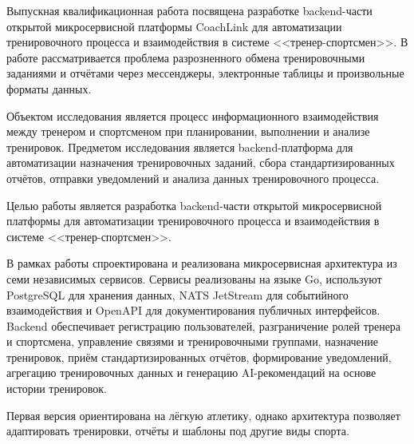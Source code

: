 \abstract


Выпускная квалификационная работа посвящена разработке backend-части открытой микросервисной платформы CoachLink для автоматизации тренировочного процесса и взаимодействия в системе <<тренер-спортсмен>>. В работе рассматривается проблема разрозненного обмена тренировочными заданиями и отчётами через мессенджеры, электронные таблицы и произвольные форматы данных.

Объектом исследования является процесс информационного взаимодействия между тренером и спортсменом при планировании, выполнении и анализе тренировок. Предметом исследования является backend-платформа для автоматизации назначения тренировочных заданий, сбора стандартизированных отчётов, отправки уведомлений и анализа данных тренировочного процесса.

Целью работы является разработка backend-части открытой микросервисной платформы для автоматизации тренировочного процесса и взаимодействия в системе <<тренер-спортсмен>>.

В рамках работы спроектирована и реализована микросервисная архитектура из семи независимых сервисов. Сервисы реализованы на языке Go, используют PostgreSQL для хранения данных, NATS JetStream для событийного взаимодействия и OpenAPI для документирования публичных интерфейсов. Backend обеспечивает регистрацию пользователей, разграничение ролей тренера и спортсмена, управление связями и тренировочными группами, назначение тренировок, приём стандартизированных отчётов, формирование уведомлений, агрегацию тренировочных данных и генерацию AI-рекомендаций на основе истории тренировок.

Первая версия ориентирована на лёгкую атлетику, однако архитектура позволяет адаптировать тренировки, отчёты и шаблоны под другие виды спорта.
